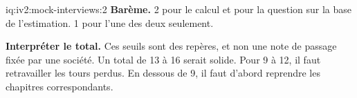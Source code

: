 \begin{solution}{iq:iv2:mock-interviews:2}
\textbf{Barème.} 2 pour le calcul et pour la question sur la base de l'estimation. 1 pour l'une des deux seulement.

\medskip
\textbf{Interpréter le total.} Ces seuils sont des repères, et non une note de passage fixée par une société. Un total de 13 à 16 serait solide. Pour 9 à 12, il faut retravailler les tours perdus. En dessous de 9, il faut d'abord reprendre les chapitres correspondants.

\end{solution}

